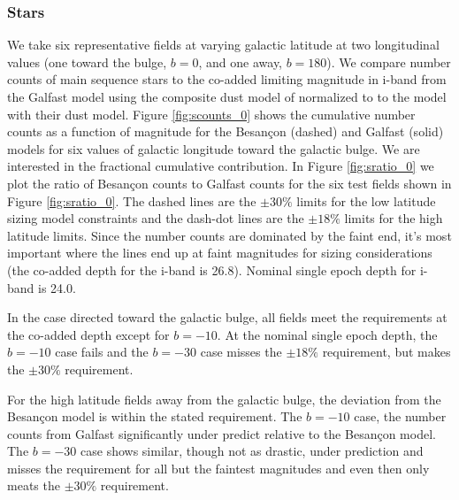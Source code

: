 \documentclass[]{article}
\begin{document}
{\subsubsection{Stars}
We take six representative fields at varying galactic latitude at two longitudinal values (one toward the bulge, $b=0$, and one away, $b=180$).  
We compare number 
counts of main sequence stars to the co-added limiting magnitude in i-band 
 from the Galfast model using the composite dust model
of \citet{amores05} normalized to \citet{schlegel98} to the \citet{besancon} model with their dust model.  Figure \ref{fig:scounts_0} shows 
the cumulative number counts as a function of magnitude for the Besan\c{c}on (dashed) and Galfast (solid) models 
for six values of galactic longitude toward the galactic bulge.  We are interested in the
fractional cumulative contribution.  In Figure \ref{fig:sratio_0} we plot the ratio of Besan\c{c}on counts to Galfast counts for the six test fields shown in Figure \ref{fig:sratio_0}.
The dashed lines are the $\pm30\%$ limits for the low latitude sizing model constraints and the dash-dot lines are the $\pm18\%$ limits for the high latitude limits.
Since the number counts are dominated by the faint end, it's most important where the lines end up at faint magnitudes for sizing considerations 
(the co-added depth for the i-band is 26.8).  
Nominal single epoch depth for i-band is 24.0.  

In the case directed toward the galactic bulge, all fields meet the requirements at the co-added depth except
for $b=-10$.  At the nominal single epoch depth, the $b=-10$ case fails and the $b=-30$ case misses the $\pm18\%$
requirement, but makes the $\pm30\%$ requirement.

For the high latitude fields away from the galactic bulge, the deviation from the Besan\c{c}on model is within 
the stated requirement.  The $b=-10$ case, the number counts from Galfast significantly under predict relative to 
the Besan\c{c}on model.  The $b=-30$ case shows similar, though not as drastic, under prediction and misses the 
requirement for all but the faintest magnitudes and even then only meats the $\pm30\%$ requirement.

}
\end{document}
